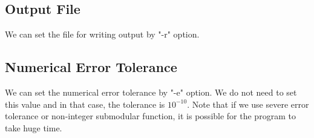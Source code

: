 \documentclass{article}
\begin{document}
\subsection{Output File}
We can set the file for writing output by "-r" option.


\subsection{Numerical Error Tolerance}
We can set the numerical error tolerance by "-e" option.
We do not need to set this value and in that case,
the tolerance is $10^{-10}$.
Note that if we use severe error tolerance or non-integer submodular function,
it is possible for the program to take huge time.





\end{document}
